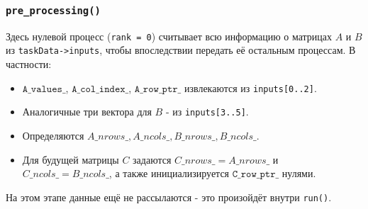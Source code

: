 \documentclass[12pt]{article}
\begin{document}
\subsubsection{\texttt{pre\_processing()}}
Здесь нулевой процесс (\texttt{rank = 0}) считывает всю информацию о матрицах \(A\) и \(B\) из \texttt{taskData->inputs}, чтобы впоследствии передать её остальным процессам. В частности:
\begin{itemize}
    \item \(\texttt{A\_values\_}\), \(\texttt{A\_col\_index\_}\), \(\texttt{A\_row\_ptr\_}\) извлекаются из \texttt{inputs[0..2]}.
    \item Аналогичные три вектора для \(B\) - из \texttt{inputs[3..5]}.
    \item Определяются \(A\_nrows\_, A\_ncols\_, B\_nrows\_, B\_ncols\_\).
    \item Для будущей матрицы \(C\) задаются \(C\_nrows\_ = A\_nrows\_\) и \(C\_ncols\_ = B\_ncols\_\), а также инициализируется \(\texttt{C\_row\_ptr\_}\) нулями.
\end{itemize}
На этом этапе данные ещё не рассылаются - это произойдёт внутри \texttt{run()}.
\end{document}
